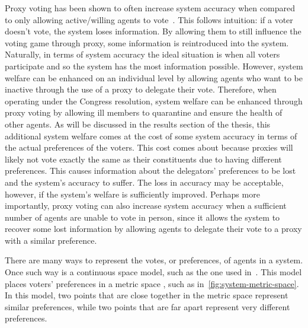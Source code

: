 Proxy voting has been shown to often increase system accuracy when compared to only
allowing active/willing agents to vote~\cite{Cohensius2017}.
This follows intuition: if a voter doesn't vote, the system loses information.
By allowing them to still influence the voting game through proxy, some information
is reintroduced into the system.
Naturally, in terms of system accuracy the ideal situation is when all voters
participate and so the system has the most information possible.
However, system welfare can be enhanced on an individual level by allowing agents
who want to be inactive through the use of a proxy to delegate their vote.
Therefore, when operating under the Congress resolution, system welfare can be
enhanced through proxy voting by allowing ill members to quarantine and ensure the
health of other agents.
As will be discussed in the results section of the thesis,
this additional system welfare comes at the cost of some system accuracy in terms of
the actual preferences of the voters.
This cost comes about because proxies will likely not vote exactly the same as their
constituents due to having different preferences.
This causes information about the delegators' preferences to be lost and the system's
accuracy to suffer.
The loss in accuracy may be acceptable, however, if the system's welfare is sufficiently
improved.
Perhaps more importantly, proxy voting can also increase system accuracy when a
sufficient number of agents are unable to vote in person, since it allows the system
to recover some lost information by allowing agents to delegate their vote to a proxy
with a similar preference.


There are many ways to represent the votes, or preferences, of agents in a system.
Once such way is a continuous space model, such as the one used in~\cite{Cohensius2017}.
This model places voters' preferences in a metric space \systemspace, such as
in~\autoref{fig:system-metric-space}.
In this model, two points that are close together in the metric space represent
similar preferences, while two points that are far apart represent very different
preferences.

